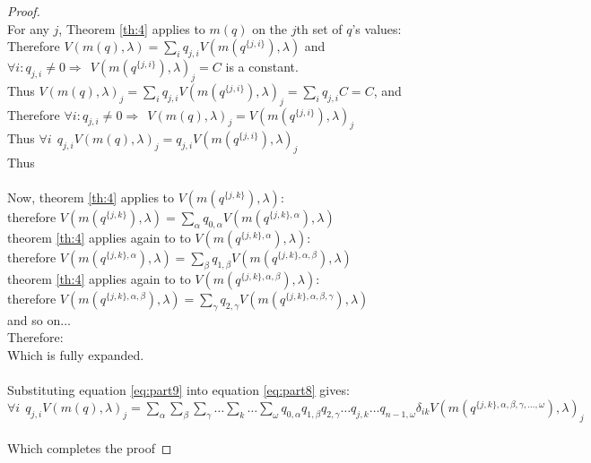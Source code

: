 \begin{proof}$~$\\
For any $j$, Theorem \ref{th:4} applies to $m(q)$ on the $j$th set of $q$'s values:\\
Therefore $V(m(q),\lambda)=\sum_i q_{j,i}V(m(q^{\{j,i\}}),\lambda)$ and $\forall i:q_{j,i}\ne 0\Rightarrow~~V(m(q^{\{j,i\}}),\lambda)_j=C$ is a constant.\\
Thus $V(m(q),\lambda)_j=\sum_i q_{j,i}V(m(q^{\{j,i\}}),\lambda)_j=\sum_i q_{j,i}C=C$, and\\
Therefore $\forall i:q_{j,i}\ne 0\Rightarrow~~V(m(q),\lambda)_j=V(m(q^{\{j,i\}}),\lambda)_j$\\
Thus $\forall i~~q_{j,i}V(m(q),\lambda)_j= q_{j,i}V(m(q^{\{j,i\}}),\lambda)_j$\\
Thus \\
\\
Now, theorem \ref{th:4} applies to $V(m(q^{\{j,k\}}),\lambda)$:\\
therefore $V(m(q^{\{j,k\}}),\lambda) = \sum_\alpha q_{0,\alpha}V(m(q^{\{j,k\},\alpha}),\lambda)$\\
theorem \ref{th:4} applies again to to $V(m(q^{\{j,k\},\alpha}),\lambda)$:\\
therefore $V(m(q^{\{j,k\},\alpha}),\lambda) = \sum_\beta q_{1,\beta}V(m(q^{\{j,k\},\alpha,\beta}),\lambda)$\\
theorem \ref{th:4} applies again to to $V(m(q^{\{j,k\},\alpha,\beta}),\lambda)$:\\
therefore $V(m(q^{\{j,k\},\alpha,\beta}),\lambda) = \sum_\gamma q_{2,\gamma}V(m(q^{\{j,k\},\alpha,\beta,\gamma}),\lambda)$\\
and so on$\dots$\\
Therefore: \\
Which is fully expanded.\\
\\
Substituting equation \ref{eq:part9} into equation \ref{eq:part8} gives:\\
$\forall i~~q_{j,i}V(m(q),\lambda)_j = \sum_\alpha\sum_\beta\sum_\gamma\dots\sum_k\dots\sum_\omega q_{0,\alpha}q_{1,\beta}q_{2,\gamma}\dots q_{j,k}\dots q_{n-1,\omega}\delta_{ik}V(m(q^{\{j,k\},\alpha,\beta,\gamma,\dots,\omega}),\lambda)_j$\\
\\
Which completes the proof
\end{proof}
